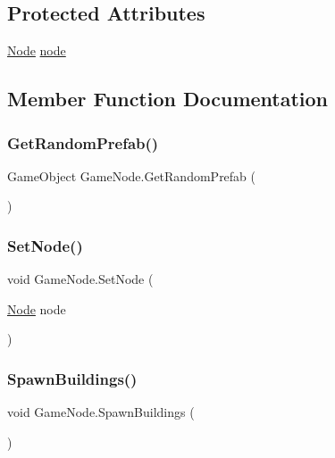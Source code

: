 \subsection*{Protected Attributes}
\begin{DoxyCompactItemize}
\item 
\mbox{\hyperlink{class_node}{Node}} \mbox{\hyperlink{class_game_node_a1358112884b99c36b3a37c4e65c24529}{node}}
\end{DoxyCompactItemize}


\subsection{Member Function Documentation}
\mbox{\label{class_game_node_a7769f0664b29bd4ce2178f5c3d511acc}} 
\subsubsection{\texorpdfstring{Get\+Random\+Prefab()}{GetRandomPrefab()}}
{\footnotesize\ttfamily Game\+Object Game\+Node.\+Get\+Random\+Prefab (\begin{DoxyParamCaption}{ }\end{DoxyParamCaption})}

\mbox{\label{class_game_node_ac4c8f9eaeeb02827025d4999f461e4f7}} 
\subsubsection{\texorpdfstring{Set\+Node()}{SetNode()}}
{\footnotesize\ttfamily void Game\+Node.\+Set\+Node (\begin{DoxyParamCaption}\item[{\mbox{\hyperlink{class_node}{Node}}}]{node }\end{DoxyParamCaption})}

\mbox{\label{class_game_node_a28d8bb98f35b26d076a02f656708c798}} 
\subsubsection{\texorpdfstring{Spawn\+Buildings()}{SpawnBuildings()}}
{\footnotesize\ttfamily void Game\+Node.\+Spawn\+Buildings (\begin{DoxyParamCaption}{ }\end{DoxyParamCaption})}



